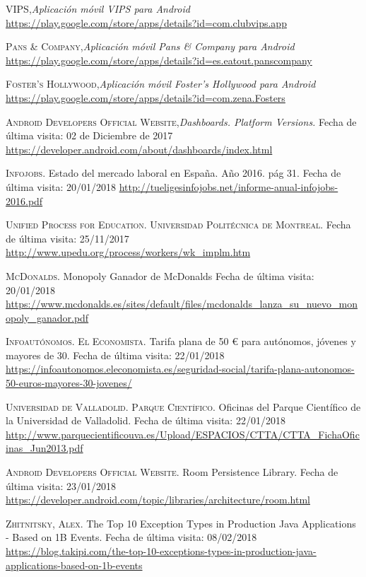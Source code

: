 \documentclass[twoside]{report}
\begin{document}
\begin{thebibliography}{a}
 \textsc{VIPS},\textit{Aplicación móvil VIPS para Android} \url{https://play.google.com/store/apps/details?id=com.clubvips.app}

 \textsc{Pans \& Company},\textit{Aplicación móvil Pans \& Company para Android} \url{https://play.google.com/store/apps/details?id=es.eatout.panscompany}

 \textsc{Foster's Hollywood},\textit{Aplicación móvil Foster's Hollywood para Android} \url{https://play.google.com/store/apps/details?id=com.zena.Fosters}

 \textsc{Android Developers Official Website},\textit{Dashboards. Platform Versions.} Fecha de última visita: 02 de Diciembre de 2017 \url{https://developer.android.com/about/dashboards/index.html}

 \textsc{Infojobs}. Estado del mercado laboral en España. Año 2016. pág 31. Fecha de última visita: 20/01/2018 \url{http://tueligesinfojobs.net/informe-anual-infojobs-2016.pdf} 

 \textsc{Unified Process for Education. Universidad Politécnica de Montreal}. Fecha de última visita: 25/11/2017 \url{http://www.upedu.org/process/workers/wk_implm.htm}

 \textsc{McDonalds}. Monopoly Ganador de McDonalds Fecha de última visita: 20/01/2018 \url{https://www.mcdonalds.es/sites/default/files/mcdonalds_lanza_su_nuevo_monopoly_ganador.pdf}

 \textsc{Infoautónomos. El Economista}. Tarifa plana de 50 \euro \hspace{0.1cm} para autónomos, jóvenes y mayores de 30. Fecha de última visita: 22/01/2018 \url{https://infoautonomos.eleconomista.es/seguridad-social/tarifa-plana-autonomos-50-euros-mayores-30-jovenes/}

 \textsc{Universidad de Valladolid. Parque Científico}. Oficinas del Parque Científico de la Universidad de Valladolid. Fecha de última visita: 22/01/2018 \url{http://www.parquecientificouva.es/Upload/ESPACIOS/CTTA/CTTA_FichaOficinas_Jun2013.pdf}

 \textsc{Android Developers Official Website}. Room Persistence Library. Fecha de última visita: 23/01/2018 \url{https://developer.android.com/topic/libraries/architecture/room.html}

 \textsc{Zhitnitsky, Alex}. The Top 10 Exception Types in Production Java Applications - Based on 1B Events. Fecha de última visita: 08/02/2018 \url{https://blog.takipi.com/the-top-10-exceptions-types-in-production-java-applications-based-on-1b-events}


\end{thebibliography}
\end{document}
